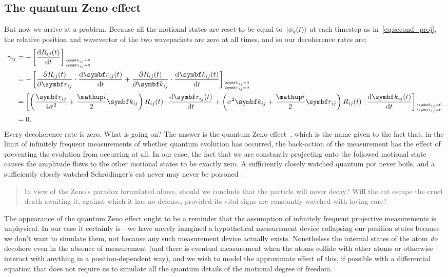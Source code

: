\subsection{The quantum Zeno effect}\label{sec:zeno_effect}

But now we arrive at a problem. Because all the motional states are reset to be equal to $\ket{\phi_\eta(t)}$ at each timestep as in~\eqref{eq:second_proj}, the relative position and wavevector of the two wavepackets are zero at all times, and so our decoherence rates are:
\begin{align}
\gamma_{ij} &= -\left[\dv{R_{ij}(t)}{t}\right]_{
\stackon[1pt]
{$\scriptscriptstyle\, \vec v_{ij} = 0$}
{$\scriptscriptstyle\, \vec k_{ij} = 0$}
}\\
&= -\left[
\pdv{R_{ij}(t)}{\vec r_{ij}}\cdot \dv{\vec r_{ij}(t)}{t} + 
\pdv{R_{ij}(t)}{\vec k_{ij}}\cdot \dv{\vec k_{ij}(t)}{t}\right]_{
\stackon[1pt]
{$\scriptscriptstyle\, \vec v_{ij} = 0$}
{$\scriptscriptstyle\, \vec k_{ij} = 0$}
}\\
&= \left[
\left(
\frac{\vec r_{ij}}{4\sigma^2} + \frac\ii2\vec k_{ij}
\right)R_{ij}(t)\cdot\dv{\vec r_{ij}(t)}{t}
+ \left(
\sigma^2\vec k_{ij} + \frac\ii2\vec r_{ij}
\right)R_{ij}(t)\cdot\dv{\vec k_{ij}(t)}{t}
\right]_{
\stackon[1pt]
{$\scriptscriptstyle\, \vec v_{ij} = 0$}
{$\scriptscriptstyle\, \vec k_{ij} = 0$}
}\\
&= 0.
\end{align}
Every decoherence rate is zero. What is going on? The answer is the quantum Zeno effect~\cite{PhysRevA.41.2295, doi:10.1063/1.523304}, which is the name given to the fact that, in the limit of infinitely frequent measurements of whether quantum evolution has occurred, the back-action of the measurement has the effect of preventing the evolution from occurring at all. In our case, the fact that we are constantly projecting onto the followed motional state causes the amplitude flows to the other motional states to be exactly zero. A sufficiently closely watched quantum pot never boils, and a sufficiently closely watched Schr\"odinger's cat never may never be poisoned~\cite{doi:10.1063/1.523304}:
\begin{quote}
In view of
the Zeno's paradox formulated above, should we conclude
that the particle will never decay? Will the cat
escape the cruel death awaiting it, against which it has
no defense, provided its vital signs are constantly
watched with loving care? 
\end{quote}
The appearance of the quantum Zeno effect ought to be a reminder that the assumption of infinitely frequent projective measurements is unphysical. In our case it certainly is---we have merely imagined a hypothetical measurement device collapsing our position states because we don't want to simulate them, not because any such measurement device actually exists. Nonetheless the internal states of the atom \emph{do} decohere even in the absence of measurement (and there is eventual measurement when the atoms collide with other atoms or otherwise interact with anything in a position-dependent way), and we wish to model the approximate effect of this, if possible with a differential equation that does not require us to simulate all the quantum details of the motional degree of freedom.

